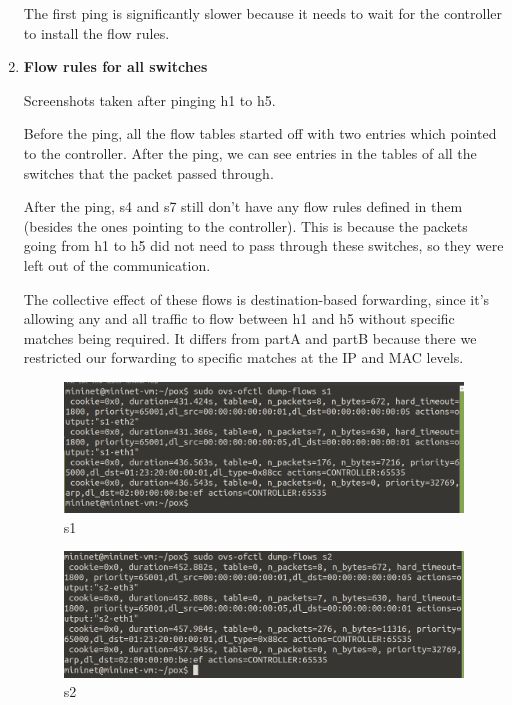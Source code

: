 \documentclass{article}[12pt]
\begin{document}
\begin{enumerate}
    The first ping is significantly slower because it needs to wait for the controller to install the flow rules.

    \item \textbf{Flow rules for all switches}
    
    Screenshots taken after pinging h1 to h5.

    Before the ping, all the flow tables started off with two entries which pointed to the controller. After the ping, we can see entries in the tables of all the switches that the packet passed through. 
    
    After the ping, s4 and s7 still don't have any flow rules defined in them (besides the ones pointing to the controller). This is because the packets going from h1 to h5 did not need to pass through these switches, so they were left out of the communication.

    The collective effect of these flows is destination-based forwarding, since it's allowing any and all traffic to flow between h1 and h5 without specific matches being required. It differs from partA and partB because there we restricted our forwarding to specific matches at the IP and MAC levels.
    
    \begin{figure}[!h]
        \centering
        \includegraphics[width=\textwidth,height=\textheight,keepaspectratio]{s1.png}
        \caption{s1}
    \end{figure}

    \begin{figure}[!h]
        \centering
        \includegraphics[width=\textwidth,height=\textheight,keepaspectratio]{s2.png}
        \caption{s2}
    \end{figure}


\end{enumerate}
\end{document}
